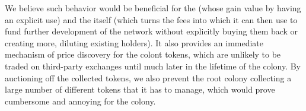 We believe such behavior would be beneficial for the \rcths (whose \rcts gain value by having an explicit use) and the \rc itself (which turns the fees into \rcts which it can then use to fund further development of the network without explicitly buying them back or creating more, diluting existing holders). It also provides an immediate mechanism of price discovery for the colont tokens, which are unlikely to be traded on third-party exchanges until much later in the lifetime of the colony. By auctioning off the collected tokens, we also prevent the root colony collecting a large number of different tokens that it has to manage, which would prove cumbersome and annoying for the colony.



